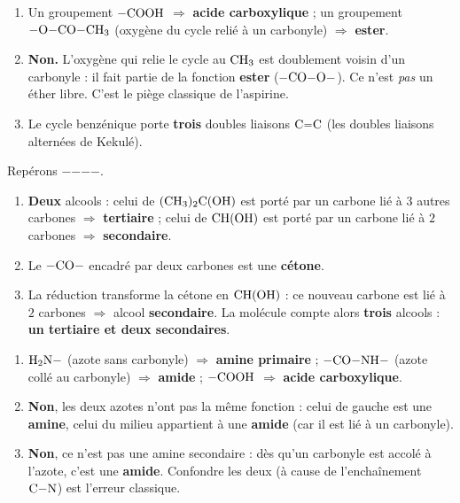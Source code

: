 \documentclass[11pt,a4paper]{article}
\begin{document}
\begin{corrige}
\begin{enumerate}[label=\alph*)]
  \item Un groupement $-\ce{COOH}$ $\Rightarrow$ \textbf{acide carboxylique} ; un groupement $\ce{-O-CO-CH3}$ (oxygène du cycle relié à un carbonyle) $\Rightarrow$ \textbf{ester}.
  \item \textbf{Non.} L'oxygène qui relie le cycle au $\ce{CH3}$ est doublement voisin d'un carbonyle : il fait partie de la fonction \textbf{ester} ($-\ce{CO-O}-$). Ce n'est \emph{pas} un éther libre. C'est le piège classique de l'aspirine.
  \item Le cycle benzénique porte \textbf{trois} doubles liaisons $\ce{C=C}$ (les doubles liaisons alternées de Kekulé).
\end{enumerate}
\end{corrige}

\begin{corrige}
Repérons $-$$-$$-$$-$.
\begin{enumerate}[label=\alph*)]
  \item \textbf{Deux} alcools : celui de $\ce{(CH3)2C(OH)}$ est porté par un carbone lié à $3$ autres carbones $\Rightarrow$ \textbf{tertiaire} ; celui de $\ce{CH(OH)}$ est porté par un carbone lié à $2$ carbones $\Rightarrow$ \textbf{secondaire}.
  \item Le $\ce{-CO-}$ encadré par deux carbones est une \textbf{cétone}.
  \item La réduction transforme la cétone en $\ce{CH(OH)}$ : ce nouveau carbone est lié à $2$ carbones $\Rightarrow$ alcool \textbf{secondaire}. La molécule compte alors \textbf{trois} alcools : \textbf{un tertiaire et deux secondaires}.
\end{enumerate}
\end{corrige}

\begin{corrige}
\begin{enumerate}[label=\alph*)]
  \item $\ce{H2N}-$ (azote sans carbonyle) $\Rightarrow$ \textbf{amine primaire} ; $-\ce{CO-NH}-$ (azote collé au carbonyle) $\Rightarrow$ \textbf{amide} ; $-\ce{COOH}$ $\Rightarrow$ \textbf{acide carboxylique}.
  \item \textbf{Non}, les deux azotes n'ont pas la même fonction : celui de gauche est une \textbf{amine}, celui du milieu appartient à une \textbf{amide} (car il est lié à un carbonyle).
  \item \textbf{Non}, ce n'est pas une amine secondaire : dès qu'un carbonyle est accolé à l'azote, c'est une \textbf{amide}. Confondre les deux (à cause de l'enchaînement $\ce{C-N}$) est l'erreur classique.
\end{enumerate}
\end{corrige}
\end{document}
